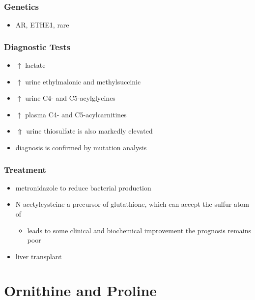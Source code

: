 \documentclass{scrartcl}
\begin{document}
\subsubsection{Genetics}
\label{sec:orgd6f7d6e}
\begin{itemize}
\item AR, ETHE1, rare
\end{itemize}

\subsubsection{Diagnostic Tests}
\label{sec:org11aea44}
\begin{itemize}
\item \(\uparrow\) lactate
\item \(\uparrow\) urine ethylmalonic and methylsuccinic
\item \(\uparrow\) urine C4- and C5-acylglycines
\item \(\uparrow\) plasma C4- and C5-acylcarnitines
\item \(\Uparrow\) urine thiosulfate is also markedly elevated
\item diagnosis is confirmed by mutation analysis
\end{itemize}

\subsubsection{Treatment}
\label{sec:org283a495}
\begin{itemize}
\item metronidazole to reduce bacterial  production
\item N-acetylcysteine a precursor of glutathione, which can accept the sulfur atom of 
\begin{itemize}
\item leads to some clinical and biochemical improvement the prognosis remains poor
\end{itemize}
\item liver transplant
\end{itemize}

\section{Ornithine and Proline}
\label{sec:orge5b26c9}
\end{document}
